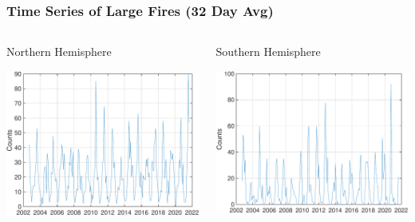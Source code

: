 \documentclass[10pt,t]{beamer}
\begin{document}
\begin{frame}
\frametitle{Time Series of Large Fires  (32 Day Avg)}
\vspace{-0.3in}

\begin{columns}
\begin{column}{0.55\columnwidth}
\begin{block}{\footnotesize Northern Hemisphere}
\vspace{-0.1in}
\begin{center}
\includegraphics[width=\linewidth]{./Yung/firecounts_nhemis_t2616p302_tdiff3.pdf}
\end{center}
\end{block}
\end{column}


\begin{column}{0.55\columnwidth}
\begin{block}{\footnotesize Southern Hemisphere}
\vspace{-0.1in}
\begin{center}
\includegraphics[width=\linewidth]{./Yung/firecounts_shemis_t2616p302_tdiff3.pdf}
\end{center}
\end{block}
\end{column}
\end{columns}


\end{frame}
\end{document}
